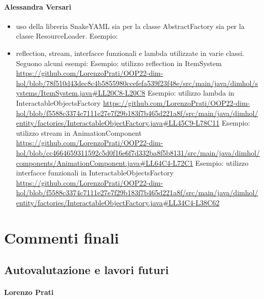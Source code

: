\documentclass[a4paper,12pt]{report}
\begin{document}
\subsubsection*{Alessandra Versari}
\begin{itemize}
	\item uso della libreria SnakeYAML sia per la classe AbstractFactory sia per la classe ResourceLoader.
	Esempio: \url{}
	\item reflection, stream, interfacce funzionali e lambda utilizzate in varie classi. Seguono alcuni esempi:
	Esempio: utilizzo reflection in ItemSystem \url{https://github.com/LorenzoPrati/OOP22-dim-hol/blob/78f510d43dec8c4b5855980ccefefa539f23f48e/src/main/java/dimhol/systems/ItemSystem.java#LL20C8-L20C8}
	Esempio: utilizzo lambda in InteractableObjectsFactory \url{https://github.com/LorenzoPrati/OOP22-dim-hol/blob/f5588c3374c7111e27e7f29b183f7b465d221a8f/src/main/java/dimhol/entity/factories/InteractableObjectFactory.java#LL45C9-L78C11}
	Esempio: utilizzo stream in AnimationComponent \url{https://github.com/LorenzoPrati/OOP22-dim-hol/blob/cc4664659311592c5d0f16e6f7d332ba8f5b8131/src/main/java/dimhol/components/AnimationComponent.java#LL64C4-L72C1}
	Esempio: utilizzo interfacce funzionali in InteractableObjectsFactory \url{https://github.com/LorenzoPrati/OOP22-dim-hol/blob/f5588c3374c7111e27e7f29b183f7b465d221a8f/src/main/java/dimhol/entity/factories/InteractableObjectFactory.java#LL34C4-L38C62}
\end{itemize}


\chapter{Commenti finali}


\section{Autovalutazione e lavori futuri}

\subsubsection{Lorenzo Prati}
\end{document}
